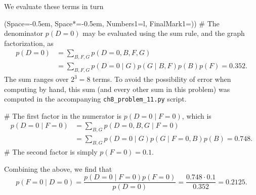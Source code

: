 \documentclass[12pt, a4paper]{article}
\newcommand{\listSpace}{-0.5em}%
\begin{document}
We evaluate these terms in turn
\begin{easylist}[enumerate]
	\ListProperties(Space=\listSpace, Space*=\listSpace, Numbers1=l, FinalMark1={)})
	# The denominator $p( D = 0)$ may be evaluated using the sum rule, and the graph factorization, as
	\begin{align*}
		p( D = 0) &= \sum_{B, F, G} p( D = 0, B, F, G) \\
		&= \sum_{B, F, G} p( D = 0 \mid G) p( G \mid B, F) p(B) p (F)
		= 0.352.
	\end{align*}
	The sum ranges over $2^3 = 8$ terms.
	To avoid the possibility of error when computing by hand, this sum (and every other sum in this problem) was computed in the accompanying \texttt{ch8\_problem\_11.py} script.
	
	# The first factor in the numerator is $p(D = 0 \mid F =0)$, which is
	\begin{align*}
		p(D = 0 \mid F =0) &= \sum_{B, G} p(D=0, B, G \mid F = 0) \\
		&= \sum_{B, G} p(D = 0 \mid G) p(G \mid F =0, B) p(B)
		= 0.748.
	\end{align*}
	# The second factor is simply $p(F=0) = 0.1$.
\end{easylist}
Combining the above, we find that
\begin{equation*}
p(F=0 \mid D = 0) = \frac{p(D = 0 \mid F =0) p(F=0)}{p( D = 0)}
=
\frac{0.748 \cdot 0.1}{0.352} = 0.2125.
\end{equation*}
\end{document}
